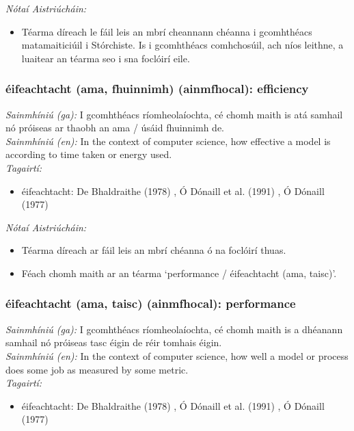  \noindent \textit{Nótaí Aistriúcháin:}
\begin{itemize}
	\item Téarma díreach le fáil leis an mbrí cheannann chéanna i gcomhthéacs matamaiticiúil i Stórchiste. Is i gcomhthéacs comhchosúil, ach níos leithne, a luaitear an téarma seo i sna foclóirí eile.
\end{itemize}


\subsubsection*{éifeachtacht (ama, fhuinnimh) (ainmfhocal): efficiency}
 \noindent \textit{Sainmhíniú (ga):} I gcomhthéacs ríomheolaíochta, cé chomh maith is atá samhail nó próiseas ar thaobh an ama / úsáid fhuinnimh de.
\\
 \noindent \textit{Sainmhíniú (en):} In the context of computer science, how effective a model is according to time taken or energy used.
\\
 \noindent \textit{Tagairtí:}
\begin{itemize}
	\item éifeachtacht: De Bhaldraithe (1978) \cite{de-bhaldraithe}, Ó Dónaill et al. (1991) \cite{focloir-beag}, Ó Dónaill (1977) \cite{odonaill}
\end{itemize}

 \noindent \textit{Nótaí Aistriúcháin:}
\begin{itemize}
	\item Téarma díreach ar fáil leis an mbrí chéanna ó na foclóirí thuas.
	\item Féach chomh maith ar an téarma `performance / éifeachtacht (ama, taisc)'.
\end{itemize}


\subsubsection*{éifeachtacht (ama, taisc) (ainmfhocal): performance}
 \noindent \textit{Sainmhíniú (ga):} I gcomhthéacs ríomheolaíochta, cé chomh maith is a dhéanann samhail nó próiseas tasc éigin de réir tomhais éigin.
\\
 \noindent \textit{Sainmhíniú (en):} In the context of computer science, how well a model or process does some job as measured by some metric.
\\
 \noindent \textit{Tagairtí:}
\begin{itemize}
	\item éifeachtacht: De Bhaldraithe (1978) \cite{de-bhaldraithe}, Ó Dónaill et al. (1991) \cite{focloir-beag}, Ó Dónaill (1977) \cite{odonaill}
\end{itemize}

